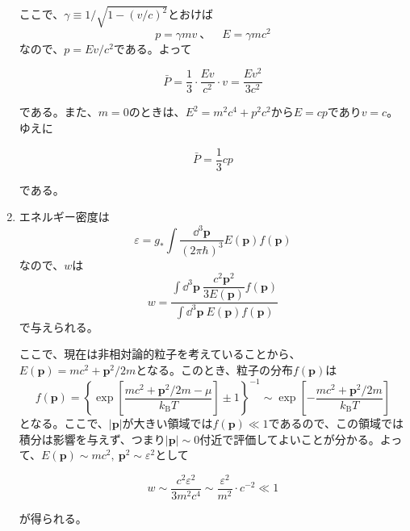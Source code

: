 \documentclass[unicode,a4paper,10pt]{ltjsarticle}
\begin{document}
\begin{enumerate}
        ここで、$\gamma\equiv1/\sqrt{1-(v/c)^2}$とおけば
        \begin{equation}
          p
          =
          \gamma mv
          \ 、\quad
          E
          =
          \gamma mc^2
        \end{equation}
        なので、$p=Ev/c^2$である。よって
        \begin{graybox}
          \begin{equation}
            \bar{P}
            =
            \frac{1}{3}\cdot\frac{Ev}{c^2}\cdot v
            =
            \frac{Ev^2}{3c^2}
          \end{equation}
        \end{graybox}
        である。また、$m=0$のときは、$E^2=m^2c^4+p^2c^2$から$E=cp$であり$v=c$。ゆえに
        \begin{graybox}
          \begin{equation}
            \bar{P}
            =
            \frac{1}{3}cp
          \end{equation}
        \end{graybox}
        である。


  \item
        エネルギー密度は
        \begin{equation}
          \varepsilon
          =
          g_{*}\int\frac{\dd^3\bm{p}}{(2\pi\hbar)^3}E(\bm{p})f(\bm{p})
        \end{equation}
        なので、$w$は
        \begin{equation}
          w
          =
          \dfrac{\displaystyle
            \int\dd^3\bm{p}\ \dfrac{c^2\bm{p}^2}{3E(\bm{p})}f(\bm{p})
          }{\displaystyle
            \int\dd^3\bm{p}\ E(\bm{p})f(\bm{p})
          }
        \end{equation}
        で与えられる。

        ここで、現在は非相対論的粒子を考えていることから、$E(\bm{p})=mc^2+\bm{p}^2/2m$となる。このとき、粒子の分布$f(\bm{p})$は
        \begin{equation}
          f(\bm{p})
          =
          \left\{ \exp\left[ \dfrac{mc^2+\bm{p}^2/2m-\mu}{k_{\textrm{B}}T} \right] \pm 1 \right\}^{-1}
          \sim
          \exp\left[ -\dfrac{mc^2+\bm{p}^2/2m}{k_{\textrm{B}}T} \right]
        \end{equation}
        となる。ここで、$|\bm{p}|$が大きい領域では$f(\bm{p})\ll 1$であるので、この領域では積分は影響を与えず、つまり$|\bm{p}|\sim 0$付近で評価してよいことが分かる。よって、$E(\bm{p})\sim mc^2,\ \bm{p}^2\sim\varepsilon^2$として
        \begin{graybox}
          \begin{equation}
            w
            \sim
            \frac{c^2\varepsilon^2}{3m^2c^4}
            \sim
            \frac{\varepsilon^2}{m^2}\cdot
            c^{-2}\ll 1
          \end{equation}          
        \end{graybox}
        が得られる。



\end{enumerate}
\end{document}
